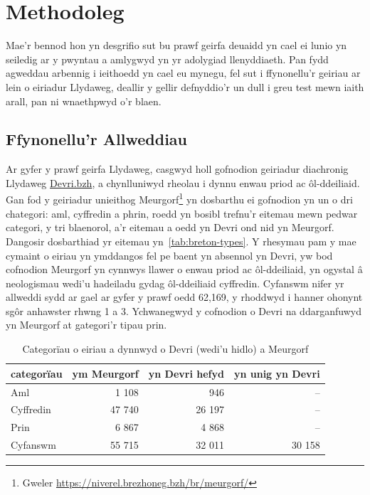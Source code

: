 ﻿\chapter{Methodoleg}

Mae'r bennod hon yn desgrifio sut bu prawf geirfa deuaidd yn cael ei lunio yn seiledig ar y pwyntau a amlygwyd yn yr adolygiad llenyddiaeth. Pan fydd agweddau arbennig i ieithoedd yn cael eu mynegu, fel sut i ffynonellu'r geiriau ar lein o eiriadur Llydaweg, deallir y gellir defnyddio'r un dull i greu test mewn iaith arall, pan ni wnaethpwyd o'r blaen.

\section{Ffynonellu'r Allweddiau}
Ar gyfer y prawf geirfa Llydaweg, casgwyd holl gofnodion geiriadur diachronig Llydaweg \href{https://devri.bzh/}{Devri.bzh}, a chynlluniwyd rheolau i dynnu enwau priod ac ôl-ddeiliaid. Gan fod y geiriadur unieithog Meurgorf\footnote{Gweler \url{https://niverel.brezhoneg.bzh/br/meurgorf/}} yn dosbarthu ei gofnodion yn un o dri chategori: aml, cyffredin a phrin, roedd yn bosibl trefnu'r eitemau mewn pedwar categori, y tri blaenorol, a'r eitemau a oedd yn Devri ond nid yn Meurgorf. Dangosir dosbarthiad yr eitemau yn~\ref{tab:breton-types}. Y rhesymau pam y mae cymaint o eiriau yn ymddangos fel pe baent yn absennol yn Devri, yw bod cofnodion Meurgorf yn cynnwys llawer o enwau priod ac ôl-ddeiliaid, yn ogystal â neologismau wedi'u hadeiladu gydag ôl-ddeiliaid cyffredin. Cyfanswm nifer yr allweddi sydd ar gael ar gyfer y prawf oedd 62,169, y rhoddwyd i hanner ohonynt sgôr anhawster rhwng 1 a 3. Ychwanegwyd y cofnodion o Devri na ddarganfuwyd yn Meurgorf at gategori'r tipau prin.

\begin{table}[htbp]
    \centering
    \begin{tabular}{l|r|r|r}
        \textbf{categorïau} & \textbf{ym Meurgorf} & \textbf{yn Devri hefyd} & \textbf{yn unig yn Devri} \\
        \hline
        Aml & 1 108 & 946 & – \\
        Cyffredin & 47 740 & 26 197 & – \\
        Prin & 6 867 & 4 868 & – \\
        Cyfanswm & 55 715 & 32 011 & 30 158 \\
    \end{tabular}
    \caption{Categorïau o eiriau a dynnwyd o Devri (wedi'u hidlo) a Meurgorf}
\end{table}\label{tab:breton-types}

